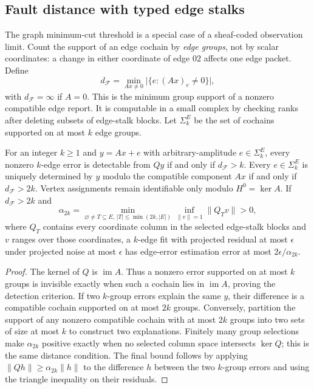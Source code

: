 \documentclass[11pt,a4paper]{article}
\begin{document}
\subsection{Fault distance with typed edge stalks}\label{sec:sheaf-distance}
The graph minimum-cut threshold is a special case of a sheaf-coded observation limit. Count the support of an edge cochain by \emph{edge groups}, not by scalar coordinates: a change in either coordinate of edge $02$ affects one edge packet. Define
\[
d_{\mathcal F}=\min_{Ax\ne0}\bigl|\{e:(Ax)_e\ne0\}\bigr|,
\]
with $d_{\mathcal F}=\infty$ if $A=0$. This is the minimum group support of a nonzero compatible edge report. It is computable in a small complex by checking ranks after deleting subsets of edge-stalk blocks. Let $\Sigma_k^{E}$ be the set of cochains supported on at most $k$ edge groups.

\begin{theorem}\label{thm:sheaf-edge-distance}
For an integer $k\ge1$ and $y=Ax+e$ with arbitrary-amplitude $e\in\Sigma_k^{E}$, every nonzero $k$-edge error is detectable from $Qy$ if and only if $d_{\mathcal F}>k$. Every $e\in\Sigma_k^{E}$ is uniquely determined by $y$ modulo the compatible component $Ax$ if and only if $d_{\mathcal F}>2k$. Vertex assignments remain identifiable only modulo $H^0=\ker A$. If $d_{\mathcal F}>2k$ and
\[
\alpha_{2k}=\min_{\varnothing\ne T\subseteq E,\,|T|\le\min(2k,|E|)}\inf_{\|v\|=1}\|Q_Tv\|>0,
\]
where $Q_T$ contains every coordinate column in the selected edge-stalk blocks and $v$ ranges over those coordinates, a $k$-edge fit with projected residual at most $\epsilon$ under projected noise at most $\epsilon$ has edge-error estimation error at most $2\epsilon/\alpha_{2k}$.
\end{theorem}
\begin{proof}
The kernel of $Q$ is $\operatorname{im}A$. Thus a nonzero error supported on at most $k$ groups is invisible exactly when such a cochain lies in $\operatorname{im}A$, proving the detection criterion. If two $k$-group errors explain the same $y$, their difference is a compatible cochain supported on at most $2k$ groups. Conversely, partition the support of any nonzero compatible cochain with at most $2k$ groups into two sets of size at most $k$ to construct two explanations. Finitely many group selections make $\alpha_{2k}$ positive exactly when no selected column space intersects $\ker Q$; this is the same distance condition. The final bound follows by applying $\|Qh\|\ge\alpha_{2k}\|h\|$ to the difference $h$ between the two $k$-group errors and using the triangle inequality on their residuals.
\end{proof}
\end{document}
